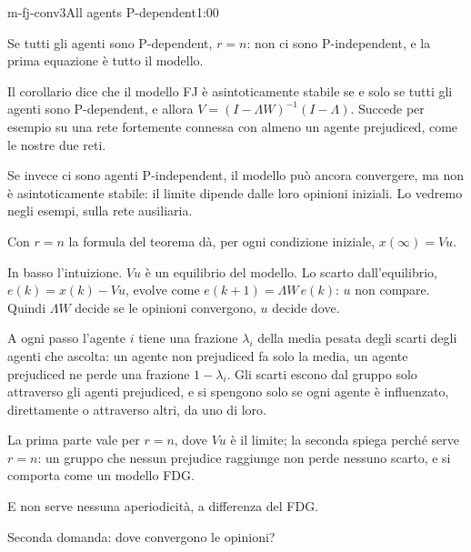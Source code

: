 \begin{slide}{m-fj-conv3}{All agents P-dependent}{1:00 {\color{red}}}
  \begin{discorso}
    \item Se tutti gli agenti sono P-dependent, $r=n$: non ci sono P-independent, e la prima equazione è tutto il modello.
    \item Il corollario dice che il modello FJ è asintoticamente stabile se e solo se tutti gli agenti sono P-dependent, e allora $V=(I-\Lambda W)^{-1}(I-\Lambda)$. Succede per esempio su una rete fortemente connessa con almeno un agente prejudiced, come le nostre due reti.
    \item {\color{blue}Se invece ci sono agenti P-independent, il modello può ancora convergere, ma non è asintoticamente stabile: il limite dipende dalle loro opinioni iniziali. Lo vedremo negli esempi, sulla rete ausiliaria.}
    \item Con $r=n$ la formula del teorema dà, per ogni condizione iniziale, $x(\infty)=Vu$.
    \item In basso l'intuizione. $Vu$ è un equilibrio del modello. Lo scarto dall'equilibrio, $e(k)=x(k)-Vu$, evolve come $e(k+1)=\Lambda W\,e(k)$: $u$ non compare. Quindi $\Lambda W$ decide se le opinioni convergono, $u$ decide dove.
    \item A ogni passo l'agente $i$ tiene una frazione $\lambda_i$ della media pesata degli scarti degli agenti che ascolta: un agente non prejudiced fa solo la media, un agente prejudiced ne perde una frazione $1-\lambda_i$. Gli scarti escono dal gruppo solo attraverso gli agenti prejudiced, e si spengono solo se ogni agente è influenzato, direttamente o attraverso altri, da uno di loro.
    \item {\color{blue}La prima parte vale per $r=n$, dove $Vu$ è il limite; la seconda spiega perché serve $r=n$: un gruppo che nessun prejudice raggiunge non perde nessuno scarto, e si comporta come un modello FDG.}
    \item E non serve nessuna aperiodicità, a differenza del FDG.
    \item Seconda domanda: dove convergono le opinioni?
  \end{discorso}
\end{slide}

